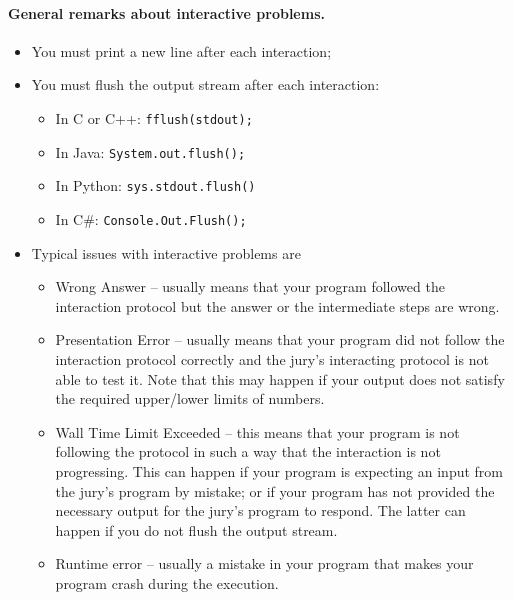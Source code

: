 \paragraph{General remarks about interactive problems.}
\begin{itemize}
    \item You must print a new line after each interaction;
    \item You must flush the output stream after each interaction:
    \begin{itemize}
        \item In C or C++: \texttt{fflush(stdout);}
        \item In Java: \texttt{System.out.flush();}
        \item In Python: \texttt{sys.stdout.flush()}
        \item In C\#: \texttt{Console.Out.Flush();}
    \end{itemize}
    \item Typical issues with interactive problems are
    \begin{itemize}
        \item Wrong Answer -- usually means that your program followed the interaction protocol but the answer or the intermediate steps are wrong.
        
        \item Presentation Error -- usually means that your program did not follow the interaction protocol correctly and the jury’s interacting protocol is not able to test it.
        Note that this may happen if your output does not satisfy the required upper/lower limits of numbers.
        
        \item Wall Time Limit Exceeded -- this means that your program is not following the protocol in such a way that the interaction is not progressing.
        This can happen if your program is expecting an input from the jury’s program by mistake; or if your program has not provided the necessary output for the jury’s program to respond.
        The latter can happen if you do not flush the output stream.
        
        \item Runtime error -- usually a mistake in your program that makes your program crash during the execution.
    \end{itemize}
\end{itemize}
